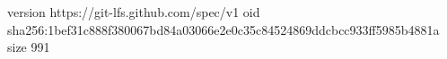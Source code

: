 version https://git-lfs.github.com/spec/v1
oid sha256:1bef31c888f380067bd84a03066e2e0c35c84524869ddcbcc933ff5985b4881a
size 991
